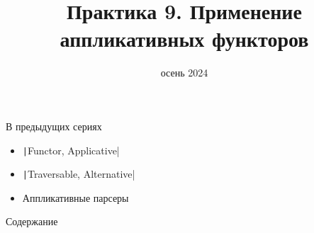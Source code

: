 
\newif\ifhandout




\title[9. Применение аппликативов]{Практика 9. Применение аппликативных функторов}
\date{осень 2024}



    \setcounter{framenumber}{-1}
    \mymaketitle

    \begin{frame}[fragile]{В предыдущих сериях}
        \begin{itemize}
            \item \texttt|Functor, Applicative|
            \item[\newtopic] \texttt|Traversable, Alternative|
            \item[\newtopic] Аппликативные парсеры
        \end{itemize}
    \end{frame}

    \begin{frame}[noframenumbering]{Содержание}
        \tableofcontents
    \end{frame}


